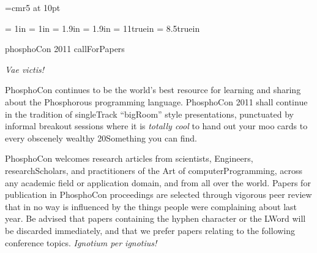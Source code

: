 


\font\titlefont=cmr5 at 10pt

\def\section#1\par{\bigskip{}\nobreak\par\noindent}

\let\footnote = \numberedfootnote

\topmargin = 1in
\bottommargin = 1in
\leftmargin = 1.9in
\rightmargin = 1.9in
\paperheight = 11truein
\paperwidth = 8.5truein


\hyphenchar{}
{\tt \hyphenchar{}}
{\it \hyphenchar{}}
{\titlefont \hyphenchar{}} %

\def\bull#1{\medskip\hbox{\vtop{\hsize12pt{$\bullet$\hfil}}
\vtop{\hsize4.5in{#1}}\hfil}}

\centerline{\titlefont phosphoCon 2011 callForPapers}
\smallskip
\centerline{{\it Vae victis!}}
\medskip

PhosphoCon continues to be the world's best resource for learning and
sharing about the Phosphorous programming language.  PhosphoCon 2011
shall continue in the tradition of singleTrack ``bigRoom'' style
presentations, punctuated by informal breakout sessions where it is
{\it totally cool} to hand out your moo cards to every obscenely
wealthy 20Something you can find.

PhosphoCon welcomes research articles from scientists, Engineers,
researchScholars, and practitioners of the Art of computerProgramming,
across any academic field or application domain, and from all over the
world.  Papers for publication in PhosphoCon proceedings are selected
through vigorous peer review that in no way is influenced by the
things people were complaining about last year.  Be advised that
papers containing the hyphen character or the LWord will be discarded
immediately, and that we prefer papers relating to the following
conference topics.  {\it Ignotium per ignotius!}


